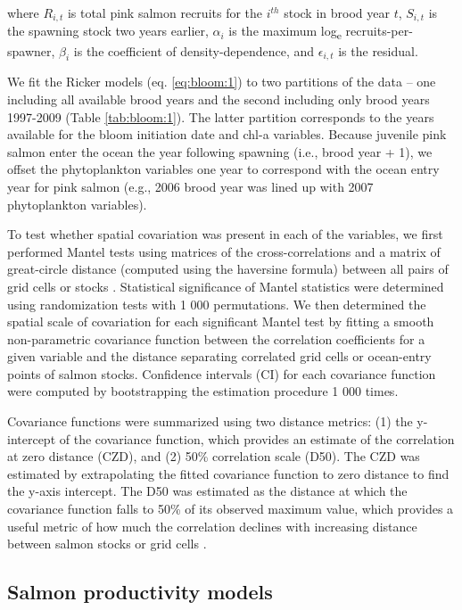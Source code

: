 \noindent where \(R_{i,t}\) is total pink salmon recruits for the \(i^{th}\)
stock in brood year \(t\), \(S_{i,t}\) is the spawning stock two years earlier,
\(\alpha_i\) is the maximum log\textsubscript{e} recruits-per-spawner,
\(\beta_i\) is the coefficient of density-dependence, and \(\epsilon_{i,t}\) is
the residual.

We fit the Ricker models (eq. \ref{eq:bloom:1}) to two partitions of the data --
one including all available brood years and the second including only brood
years 1997-2009 (Table \ref{tab:bloom:1}). The latter partition corresponds to
the years available for the bloom initiation date and chl-a variables. Because
juvenile pink salmon enter the ocean the year following spawning (i.e., brood
year + 1), we offset the phytoplankton variables one year to correspond with the
ocean entry year for pink salmon (e.g., 2006 brood year was lined up with 2007
phytoplankton variables).

To test whether spatial covariation was present in each of the variables, we
first performed Mantel tests using matrices of the cross-correlations and a
matrix of great-circle distance (computed using the haversine formula) between
all pairs of grid cells or stocks \citep{Legendre1998a, Koenig1999a}.
Statistical significance of Mantel statistics were determined using
randomization tests with 1 000 permutations. We then determined the spatial
scale of covariation for each significant Mantel test by fitting a smooth
non-parametric covariance function \citep{Bjornstad2001a} between the
correlation coefficients for a given variable and the distance separating
correlated grid cells or ocean-entry points of salmon stocks. Confidence
intervals (CI) for each covariance function were computed by bootstrapping the
estimation procedure 1 000 times.

Covariance functions were summarized using two distance metrics: (1) the
y-intercept of the covariance function, which provides an estimate of the
correlation at zero distance (CZD), and (2) 50\% correlation scale (D50). The
CZD was estimated by extrapolating the fitted covariance function to zero
distance to find the y-axis intercept. The D50 was estimated as the distance at
which the covariance function falls to 50\% of its observed maximum value, which
provides a useful metric of how much the correlation declines with increasing
distance between salmon stocks or grid cells \citep{Mueter2002b}.


\subsection{Salmon productivity models}

